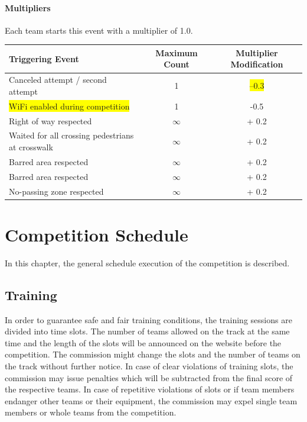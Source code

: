 \documentclass[a4paper]{report}
\begin{document}
{{{\subsubsection{Multipliers}
\label{obstacle_multipliers}

Each team starts this event with a multiplier of 1.0. 

\begin{table}[H]
\begin{tabular}{@{}lcc@{}}
\toprule
\textbf{Triggering Event}                        & \textbf{Maximum Count} & \textbf{Multiplier Modification} \\ \midrule
Canceled attempt / second attempt                & 1                      & \colorbox{yellow}{–0.3}         \\
\colorbox{yellow}{WiFi enabled during competition} & 1    & -0.5 \\
Right of way respected                           & $\infty$               & + 0.2                            \\
Waited for all crossing pedestrians at crosswalk & $\infty$               & + 0.2                            \\
Barred area respected                            & $\infty$               & + 0.2                            \\
Barred area respected                            & $\infty$               & + 0.2                            \\
No-passing zone respected                        & $\infty$               & + 0.2                            \\ 
\bottomrule
\end{tabular}
\end{table}

\chapter{Competition Schedule} 

In this chapter, the general schedule execution of the competition is described. 

\section{Training} 

In order to guarantee safe and fair training conditions, the training sessions are divided into time slots. The number of teams allowed on the track at the same time and the length of the slots will be announced on the website before the competition. The commission might change the slots and the number of teams on the track without further notice. In case of clear violations of training slots, the commission may issue penalties which will be subtracted from the final score of the respective teams. In case of repetitive violations of slots or if team members endanger other teams or their equipment, the commission may expel single team members or whole teams from the competition. 

}}}
\end{document}
